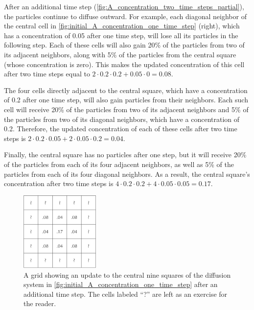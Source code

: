 After an additional time step (\autoref{fig:A_concentration_two_time_steps_partial}), the particles continue to diffuse outward. For example, each diagonal neighbor of the central cell in \autoref{fig:initial_A_concentration_one_time_step} (right), which has a concentration of 0.05 after one time step, will lose all its particles in the following step. Each of these cells will also gain 20\% of the particles from two of its adjacent neighbors, along with 5\% of the particles from the central square (whose concentration is zero). This makes the updated concentration of this cell after two time steps equal to $2 \cdot 0.2 \cdot 0.2 + 0.05 \cdot 0 = 0.08$.

The four cells directly adjacent to the central square, which have a concentration of 0.2 after one time step, will also gain particles from their neighbors. Each such cell will receive 20\% of the particles from two of its adjacent neighbors and 5\% of the particles from two of its diagonal neighbors, which have a concentration of 0.2. Therefore, the updated concentration of each of these cells after two time steps is $2 \cdot 0.2 \cdot 0.05 + 2 \cdot 0.05 \cdot 0.2 = 0.04$.

Finally, the central square has no particles after one step, but it will receive 20\% of the particles from each of its four adjacent neighbors, as well as 5\% of the particles from each of its four diagonal neighbors. As a result, the central square's concentration after two time steps is $4 \cdot 0.2 \cdot 0.2 + 4 \cdot 0.05 \cdot 0.05 = 0.17$.\\

\begin{figure}[h]
\centering
\mySfFamily
\includegraphics[width = 0.35\textwidth]{../images/A_concentration_two_time_steps_partial.png}
\caption{A grid showing an update to the central nine squares of the diffusion system in \autoref{fig:initial_A_concentration_one_time_step} after an additional time step. The cells labeled ``?'' are left as an exercise for the reader.}
\label{fig:A_concentration_two_time_steps_partial}
\end{figure}

